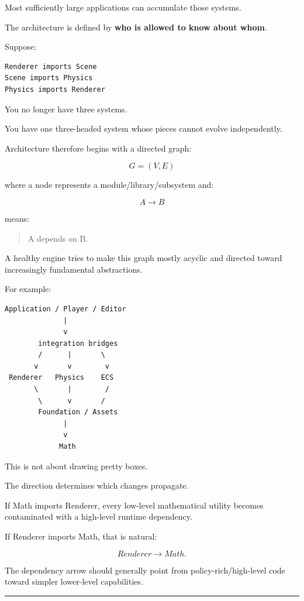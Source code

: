 Most sufficiently large applications can accumulate those systems.

The architecture is defined by \textbf{who is allowed to know about whom}.

Suppose:

\begin{verbatim}
Renderer imports Scene
Scene imports Physics
Physics imports Renderer
\end{verbatim}

You no longer have three systems.

You have one three-headed system whose pieces cannot evolve independently.

Architecture therefore begins with a directed graph:

\[
G=(V,E)
\]

where a node represents a module/library/subsystem and:

\[
A\rightarrow B
\]

means:

\begin{quote}
A depends on B.
\end{quote}

A healthy engine tries to make this graph mostly acyclic and directed toward increasingly fundamental abstractions.

For example:

\begin{verbatim}
Application / Player / Editor
              |
              v
        integration bridges
        /      |       \
       v       v        v
 Renderer   Physics    ECS
       \       |        /
        \      v       /
        Foundation / Assets
              |
              v
             Math
\end{verbatim}

This is not about drawing pretty boxes.

The direction determines which changes propagate.

If Math imports Renderer, every low-level mathematical utility becomes contaminated with a high-level runtime dependency.

If Renderer imports Math, that is natural:

\[
Renderer\rightarrow Math.
\]

The dependency arrow should generally point from policy-rich/high-level code toward simpler lower-level capabilities.

\begin{center}\rule{0.5\linewidth}{0.5pt}\end{center}

